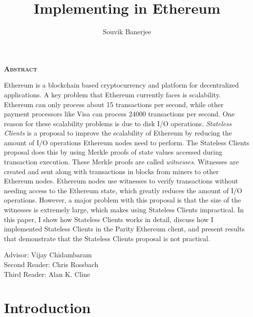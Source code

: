 \documentclass[12pt]{article}
\title{Implementing \System in Ethereum}
\author{Souvik Banerjee}
\date{}
\newcommand{\System}{Stateless Clients\xspace}
\begin{document}
\maketitle
\thispagestyle{empty}

\begin{center}
  \textsc{\textbf{Abstract}}
\end{center}

Ethereum is a blockchain based cryptocurrency and platform for decentralized applications. A key problem that Ethereum currently faces is scalability. Ethereum can only process about 15 transactions per second, while other payment processors like Visa can process \num{24000} transactions per second.  One reason for these scalability problems is due to disk I/O operations. \emph{\System} is a proposal to improve the scalability of Ethereum by reducing the amount of I/O operations Ethereum nodes need to perform. The \System proposal does this by using Merkle proofs of state values accessed during transaction execution. These Merkle proofs are called \emph{witnesses}. Witnesses are created and sent along with transactions in blocks from miners to other Ethereum nodes. Ethereum nodes use witnesses to verify transactions without needing access to the Ethereum state, which greatly reduces the amount of I/O operations. However, a major problem with this proposal is that the size of the witnesses is extremely large, which makes using \System impractical. In this paper, I show how \System works in detail, discuss how I implemented \System in the Parity Ethereum client, and present results that demonstrate that the \System proposal is not practical.

\par\bigskip\noindent\vspace{1.5in}
\begin{center}
  Advisor: Vijay Chidambaram \\
  Second Reader: Chris Rossbach \\
  Third Reader: Alan K. Cline \\
\end{center}

\newpage

\tableofcontents
\newpage


\section{Introduction} \label{section:introduction}

\end{document}
